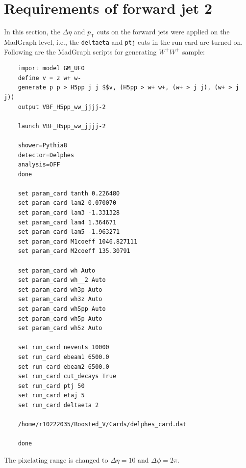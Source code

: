 \documentclass[12pt]{article}
\begin{document}
\section{Requirements of forward jet 2}%
\label{sec:requirements_of_forward_jet_2}
	In this section, the $\Delta\eta$ and $p_\text{T}$ cuts on the forward jets were applied on the MadGraph level, i.e., the \verb+deltaeta+ and \verb+ptj+ cuts in the run card are turned on. Following are the MadGraph scripts for generating $W^{+}W^{+}$ sample:
	\begin{verbatim}
	import model GM_UFO
	define v = z w+ w-
	generate p p > H5pp j j $$v, (H5pp > w+ w+, (w+ > j j), (w+ > j j))
	output VBF_H5pp_ww_jjjj-2

	launch VBF_H5pp_ww_jjjj-2

	shower=Pythia8
	detector=Delphes
	analysis=OFF
	done

	set param_card tanth 0.226480
	set param_card lam2 0.070070
	set param_card lam3 -1.331328
	set param_card lam4 1.364671
	set param_card lam5 -1.963271
	set param_card M1coeff 1046.827111
	set param_card M2coeff 135.30791

	set param_card wh Auto
	set param_card wh__2 Auto
	set param_card wh3p Auto
	set param_card wh3z Auto
	set param_card wh5pp Auto
	set param_card wh5p Auto
	set param_card wh5z Auto

	set run_card nevents 10000
	set run_card ebeam1 6500.0
	set run_card ebeam2 6500.0
	set run_card cut_decays True
	set run_card ptj 50
	set run_card etaj 5
	set run_card deltaeta 2

	/home/r10222035/Boosted_V/Cards/delphes_card.dat

	done
	\end{verbatim}

	The pixelating range is changed to $\Delta\eta = 10$ and  $\Delta\phi = 2\pi$.
\end{document}
